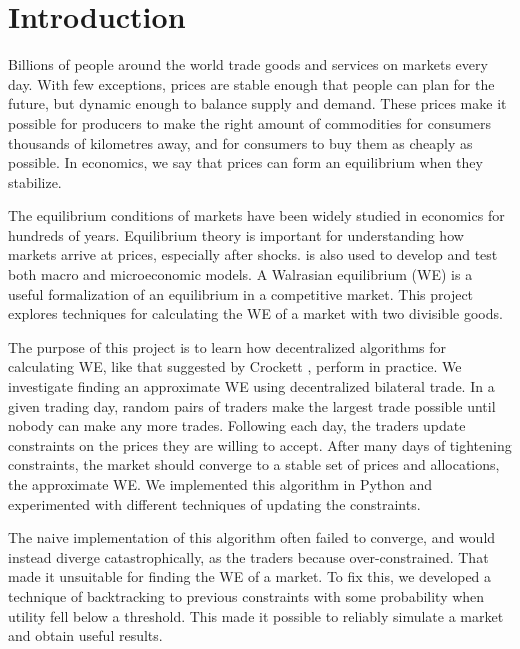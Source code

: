 \documentclass[12pt,a4paper,titlepage]{article}
\begin{document}
\tableofcontents
\newpage

\section{Introduction}
Billions of people around the world trade goods and services on markets every day.
With few exceptions, prices are stable enough that people can plan for the future, but dynamic enough to balance supply and demand.
These prices make it possible for producers to make the right amount of commodities for consumers thousands of kilometres away, and for consumers to buy them as cheaply as possible.
In economics, we say that prices can form an equilibrium when they stabilize.

The equilibrium conditions of markets have been widely studied in economics for hundreds of years.
Equilibrium theory is important for understanding how markets arrive at prices, especially after shocks. 
is also used to develop and test both macro and microeconomic models. 
A Walrasian equilibrium (WE) is a useful formalization of an equilibrium in a competitive market.
This project explores techniques for calculating the WE of a market with two divisible goods.

The purpose of this project is to learn how decentralized algorithms for calculating WE, like that suggested by Crockett \cite{crockett}, perform in practice.
We investigate finding an approximate WE using decentralized bilateral trade.
In a given trading day, random pairs of traders make the largest trade possible until nobody can make any more trades. 
Following each day, the traders update constraints on the prices they are willing to accept.
After many days of tightening constraints, the market should converge to a stable set of prices and allocations, the approximate WE.
We implemented this algorithm in Python and experimented with different techniques of updating the constraints.

The naive implementation of this algorithm often failed to converge, and would instead diverge catastrophically, as the traders because over-constrained.
That made it unsuitable for finding the WE of a market.
To fix this, we developed a technique of backtracking to previous constraints with some probability when utility fell below a threshold.
This made it possible to reliably simulate a market and obtain useful results.
\end{document}
